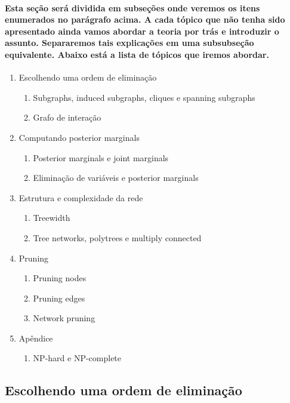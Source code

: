 \documentclass[a4paper,10pt]{article}
\theoremstyle{plain}
\begin{document}
\paragraph{
  Esta seção será dividida em subseções onde veremos os itens enumerados no parágrafo acima. A cada
  tópico que não tenha sido apresentado ainda vamos abordar a teoria por trás e introduzir o 
  assunto. Separaremos tais explicações em uma subsubseção equivalente. Abaixo está a lista de 
  tópicos que iremos abordar.
}

\begin{enumerate}
  \item Escolhendo uma ordem de eliminação
    \begin{enumerate}[label*=\arabic*.]
      \item Subgraphs, induced subgraphs, cliques e spanning subgraphs
      \item Grafo de interação
    \end{enumerate}
  \item Computando posterior marginals
    \begin{enumerate}[label*=\arabic*.]
      \item Posterior marginals e joint marginals
      \item Eliminação de variáveis e posterior marginals
    \end{enumerate}
  \item Estrutura e complexidade da rede
    \begin{enumerate}[label*=\arabic*.]
      \item Treewidth
      \item Tree networks, polytrees e multiply connected
    \end{enumerate}
  \item Pruning
    \begin{enumerate}[label*=\arabic*.]
      \item Pruning nodes
      \item Pruning edges
      \item Network pruning
    \end{enumerate}
  \item Apêndice
    \begin{enumerate}[label*=\arabic*.]
      \item NP-hard e NP-complete
    \end{enumerate}
\end{enumerate}

\subsection{Escolhendo uma ordem de eliminação}
\end{document}
